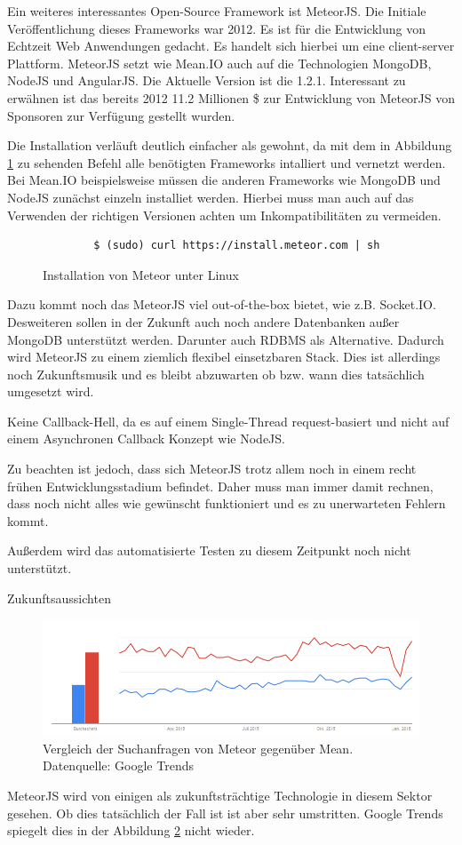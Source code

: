 Ein weiteres interessantes Open-Source Framework ist MeteorJS. Die
Initiale Veröffentlichung dieses Frameworks war 2012. Es ist für die
Entwicklung von Echtzeit Web Anwendungen gedacht. Es handelt sich
hierbei um eine client-server Plattform. MeteorJS setzt wie Mean.IO auch auf die
Technologien MongoDB, NodeJS und AngularJS. Die Aktuelle Version ist
die 1.2.1. Interessant zu erwähnen ist das bereits 2012 11.2 Millionen
\$ zur Entwicklung von MeteorJS von Sponsoren zur Verfügung gestellt wurden.
	
Die Installation verläuft deutlich einfacher als gewohnt, da mit dem in Abbildung \ref{f:instMeteor} zu sehenden Befehl alle benötigten Frameworks intalliert und vernetzt werden. Bei Mean.IO beispielsweise müssen die anderen Frameworks wie MongoDB und NodeJS zunächst einzeln installiet werden. Hierbei muss man auch auf das Verwenden der richtigen Versionen achten um Inkompatibilitäten zu vermeiden.

\begin{figure}[h]
	\centering
	\begin{lstlisting}
		$ (sudo) curl https://install.meteor.com | sh
	\end{lstlisting}
	\caption[instMeteor]{Installation von Meteor unter Linux \cite{meteor:t3n}}
	\label{f:instMeteor}
\end{figure}
	
Dazu kommt noch das MeteorJS viel out-of-the-box bietet, wie z.B. Socket.IO. Desweiteren sollen in der Zukunft auch noch andere Datenbanken außer MongoDB unterstützt werden. Darunter auch RDBMS als Alternative. Dadurch wird MeteorJS zu einem ziemlich flexibel einsetzbaren Stack. Dies ist allerdings noch Zukunftsmusik und es bleibt abzuwarten ob bzw. wann dies tatsächlich umgesetzt wird.
	
Keine Callback-Hell, da es auf einem Single-Thread request-basiert und nicht auf einem Asynchronen Callback Konzept wie NodeJS.
	
Zu beachten ist jedoch, dass sich MeteorJS trotz allem noch in einem recht frühen Entwicklungsstadium befindet. Daher muss man immer damit rechnen, dass noch nicht alles wie gewünscht funktioniert und es zu unerwarteten Fehlern kommt.
	
Außerdem wird das automatisierte Testen zu diesem Zeitpunkt noch nicht unterstützt.

Zukunftsaussichten

\begin{figure}[h]
	\centering
	\includegraphics[width=0.7\linewidth]{figures/meteor-vs-mean.png}
	\caption{Vergleich der Suchanfragen von Meteor gegenüber Mean. Datenquelle: Google Trends \cite{googleTrends:meteorVsMean}}
	\label{f:mean-frameworks:meteorVsMean}
\end{figure}

MeteorJS wird von einigen als zukunftsträchtige Technologie in diesem Sektor gesehen.
Ob dies tatsächlich der Fall ist ist aber sehr umstritten.
Google Trends spiegelt dies in der Abbildung \ref{f:mean-frameworks:meteorVsMean} nicht wieder.